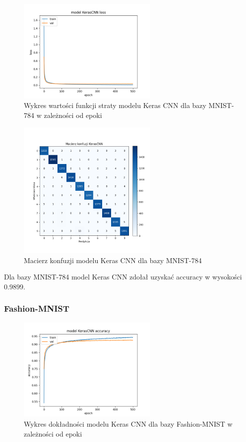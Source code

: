 \documentclass{article}
\begin{document}
\begin{figure}[H]
    \centering
    \includegraphics[width=0.6\textwidth]{../Saves/KerasCNN/mnist-784/KerasCNN_mnist_784_ep500_loss.png}
    \caption{Wykres wartości funkcji straty modelu Keras CNN dla bazy MNIST-784 w zależności od epoki} 
\end{figure}

\begin{figure}[H]
	\centering
	\includegraphics[width=0.6\textwidth]{../Saves/KerasCNN/mnist-784/KerasCNN_mnist_784_conf_mat.png}
	\caption{Macierz konfuzji modelu Keras CNN dla bazy MNIST-784}
\end{figure}
Dla bazy MNIST-784 model Keras CNN zdołał uzyskać accuracy w wysokości $0.9899$.

\subsubsection{Fashion-MNIST}
\begin{figure}[H]
    \centering
    \includegraphics[width=0.6\textwidth]{../Saves/KerasCNN/fashion-mnist/KerasCNN_fashion-mnist_ep500_acc.png}
    \caption{Wykres dokładności modelu Keras CNN dla bazy Fashion-MNIST w zależności od epoki}
\end{figure}
\end{document}
